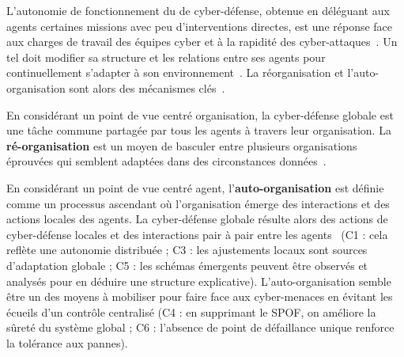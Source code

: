 L'autonomie de fonctionnement du  de cyber-défense, obtenue en déléguant aux agents certaines missions avec peu d'interventions directes, est une réponse face aux charges de travail des équipes cyber et à la rapidité des cyber-attaques~\cite{ieeesp_KottT20}.
Un tel  doit modifier sa structure et les relations entre ses agents pour continuellement s'adapter à son environnement~\cite{theron_autonomous_2021}.
La réorganisation et l'auto-organisation sont alors des mécanismes clés~\cite{picard2009reorganisation}.

En considérant un point de vue centré organisation, la cyber-défense globale est une tâche commune partagée par tous les agents à travers leur organisation.
La \textbf{ré-organisation} est un moyen de basculer entre plusieurs organisations éprouvées qui semblent adaptées dans des circonstances données~\cite{picard2009reorganisation}.

En considérant un point de vue centré agent, l’\textbf{auto-organisation} est définie comme un processus ascendant où l’organisation émerge des interactions et des actions locales des agents.
La cyber-défense globale résulte alors des actions de cyber-défense locales et des interactions pair à pair entre les agents~\cite{picard2009reorganisation} (C1 : cela reflète une autonomie distribuée ; C3 : les ajustements locaux sont sources d’adaptation globale ; C5 : les schémas émergents peuvent être observés et analysés pour en déduire une structure explicative).
L'auto-organisation semble être un des moyens à mobiliser pour faire face aux cyber-menaces en évitant les écueils d'un contrôle centralisé (C4 : en supprimant le SPOF, on améliore la sûreté du système global ; C6 : l’absence de point de défaillance unique renforce la tolérance aux pannes).



